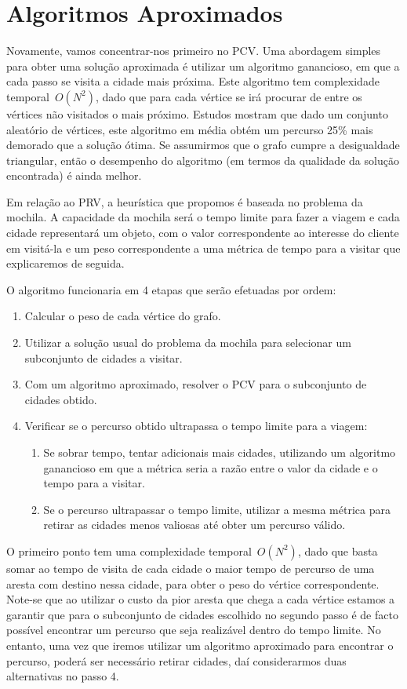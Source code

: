 \documentclass[12pt,a4paper,reqno]{report}
\numberwithin{figure}{section}
\numberwithin{equation}{section}
\begin{document}
\section{Algoritmos Aproximados}

Novamente, vamos concentrar-nos primeiro no PCV. Uma abordagem simples para obter uma solução aproximada é utilizar um algoritmo ganancioso, em que a cada passo se visita a cidade mais próxima. Este algoritmo tem complexidade temporal~$O(N^2)$, dado que para cada vértice se irá procurar de entre os vértices não visitados o mais próximo. Estudos mostram que dado um conjunto aleatório de vértices, este algoritmo em média obtém um percurso 25\% mais demorado que a solução ótima. Se assumirmos que o grafo cumpre a desigualdade triangular, então o desempenho do algoritmo (em termos da qualidade da solução encontrada) é ainda melhor.

Em relação ao PRV, a heurística que propomos é baseada no problema da mochila. A capacidade da mochila será o tempo limite para fazer a viagem e cada cidade representará um objeto, com o valor correspondente ao interesse do cliente em visitá-la e um peso correspondente a uma métrica de tempo para a visitar que explicaremos de seguida.

O algoritmo funcionaria em 4 etapas que serão efetuadas por ordem:
\begin{enumerate}
	\item Calcular o peso de cada vértice do grafo.
	\item Utilizar a solução usual do problema da mochila para selecionar um subconjunto de cidades a visitar.
	\item Com um algoritmo aproximado, resolver o PCV para o subconjunto de cidades obtido.
	\item Verificar se o percurso obtido ultrapassa o tempo limite para a viagem:
	\begin{enumerate}[label*=\arabic*.]
		\item Se sobrar tempo, tentar adicionais mais cidades, utilizando um algoritmo ganancioso em que a métrica seria a razão entre o valor da cidade e o tempo para a visitar.
		\item Se o percurso ultrapassar o tempo limite, utilizar a mesma métrica para retirar as cidades menos valiosas até obter um percurso válido.
	\end{enumerate}
\end{enumerate}

O primeiro ponto tem uma complexidade temporal~$O(N^2)$, dado que basta somar ao tempo de visita de cada cidade o maior tempo de percurso de uma aresta com destino nessa cidade, para obter o peso do vértice correspondente. Note-se que ao utilizar o custo da pior aresta que chega a cada vértice estamos a garantir que para o subconjunto de cidades escolhido no segundo passo é de facto possível encontrar um percurso que seja realizável dentro do tempo limite. No entanto, uma vez que iremos utilizar um algoritmo aproximado para encontrar o percurso, poderá ser necessário retirar cidades, daí considerarmos duas alternativas no passo 4.
\end{document}
